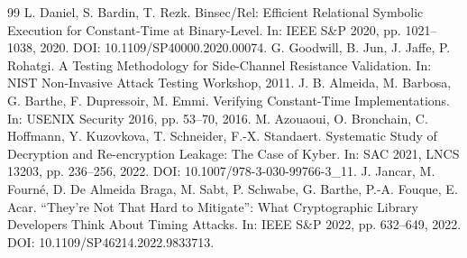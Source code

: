 \documentclass{a113_report}
\begin{document}
\begin{thebibliography}{99}
 L. Daniel, S. Bardin, T. Rezk. Binsec/Rel: Efficient Relational Symbolic Execution for Constant-Time at Binary-Level. In: IEEE S\&P 2020, pp. 1021--1038, 2020. DOI: 10.1109/SP40000.2020.00074.
 G. Goodwill, B. Jun, J. Jaffe, P. Rohatgi. A Testing Methodology for Side-Channel Resistance Validation. In: NIST Non-Invasive Attack Testing Workshop, 2011.
 J. B. Almeida, M. Barbosa, G. Barthe, F. Dupressoir, M. Emmi. Verifying Constant-Time Implementations. In: USENIX Security 2016, pp. 53--70, 2016.
 M. Azouaoui, O. Bronchain, C. Hoffmann, Y. Kuzovkova, T. Schneider, F.-X. Standaert. Systematic Study of Decryption and Re-encryption Leakage: The Case of Kyber. In: SAC 2021, LNCS 13203, pp. 236--256, 2022. DOI: 10.1007/978-3-030-99766-3\_11.
 J. Jancar, M. Fourné, D. De Almeida Braga, M. Sabt, P. Schwabe, G. Barthe, P.-A. Fouque, E. Acar. “They're Not That Hard to Mitigate”: What Cryptographic Library Developers Think About Timing Attacks. In: IEEE S\&P 2022, pp. 632--649, 2022. DOI: 10.1109/SP46214.2022.9833713.
\end{thebibliography}
\clearpage


\end{document}
